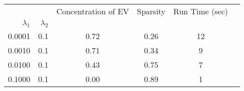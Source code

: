 \begin{tabular}{rr|cccc}
\toprule
       &     &  Concentration of EV &  Sparsity & Run Time (sec) \\
$\lambda_1$ & $\lambda_2$ &                      &           &                \\
\midrule
0.0001 & 0.1 &                 0.72 &      0.26 &             12 \\
0.0010 & 0.1 &                 0.71 &      0.34 &              9 \\
0.0100 & 0.1 &                 0.43 &      0.75 &              7 \\
0.1000 & 0.1 &                 0.00 &      0.89 &              1 \\
\bottomrule
\end{tabular}
